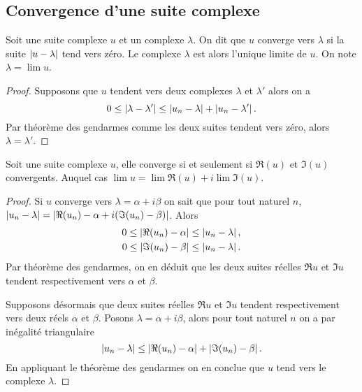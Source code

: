 \subsection{Convergence d'une suite complexe}

\begin{defdef}
  Soit une suite complexe $u$ et un complexe $\lambda$. On dit que $u$ converge vers $\lambda$ si la suite $\left\lvert u-\lambda\right\rvert$ tend vers zéro. Le complexe $\lambda$ est alors l'unique limite de $u$. On note $\lambda = \lim u$.
\end{defdef}
\begin{proof}
  Supposons que $u$ tendent vers deux complexes $\lambda$ et $\lambda'$ alors on a
  \begin{equation}
    0 \leq \left\lvert\lambda - \lambda'\right\rvert \leq \left\lvert u_n-\lambda\right\rvert + \left\lvert u_n-\lambda'\right\rvert.
  \end{equation}
Par théorème des gendarmes comme les deux suites tendent vers zéro, alors $\lambda=\lambda'$.
\end{proof}

\begin{prop}
  Soit une suite complexe $u$, elle converge si et seulement si $\Re(u)$ et $\Im(u)$ convergents. Auquel cas $\lim u = \lim \Re(u) + i \lim \Im(u)$.
\end{prop}
\begin{proof}
  Si $u$ converge vers $\lambda=\alpha+ i \beta$ on sait que pour tout naturel $n$, $\left\lvert u_n-\lambda\right\rvert=\left\lvert\Re(u_n)-\alpha + i(\Im(u_n)-\beta)\right\rvert$. Alors
  \begin{align}
    0 \leq \left\lvert\Re(u_n) -\alpha\right\rvert \leq \left\lvert u_n-\lambda\right\rvert, \\ 
    0 \leq \left\lvert\Im(u_n) -\beta\right\rvert \leq \left\lvert u_n-\lambda\right\rvert.
  \end{align}
  Par théorème des gendarmes, on en déduit que les deux suites réelles $\Re u$ et $\Im u$ tendent respectivement vers $\alpha$ et $\beta$.

  Supposons désormais que deux suites réelles $\Re u$ et $\Im u$ tendent respectivement vers deux réels $\alpha$ et $\beta$. Posons $\lambda = \alpha + i \beta$, alors pour tout naturel $n$ on a par inégalité triangulaire
\begin{equation}
  \left\lvert u_n-\lambda\right\rvert \leq \left\lvert\Re(u_n) - \alpha\right\rvert + \left\lvert\Im(u_n) - \beta\right\rvert.
\end{equation}
En appliquant le théorème des gendarmes on en conclue que $u$ tend vers le complexe $\lambda$.
\end{proof}

